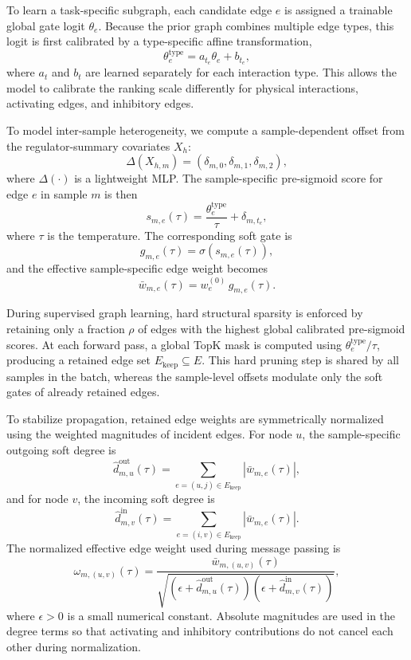 \documentclass[unnumsec,webpdf,modern,large]{oup-authoring-template}
\begin{document}
To learn a task-specific subgraph, each candidate edge \(e\) is assigned a trainable global gate logit \(\theta_e\). Because the prior graph combines multiple edge types, this logit is first calibrated by a type-specific affine transformation,
\[
\theta_e^{\mathrm{type}}=a_{t_e}\theta_e+b_{t_e},
\]
where \(a_t\) and \(b_t\) are learned separately for each interaction type. This allows the model to calibrate the ranking scale differently for physical interactions, activating edges, and inhibitory edges.

To model inter-sample heterogeneity, we compute a sample-dependent offset from the regulator-summary covariates \(X_h\):
\[
\Delta(X_{h,m})=(\delta_{m,0},\delta_{m,1},\delta_{m,2}),
\]
where \(\Delta(\cdot)\) is a lightweight MLP. The sample-specific pre-sigmoid score for edge \(e\) in sample \(m\) is then
\[
s_{m,e}(\tau)=\frac{\theta_e^{\mathrm{type}}}{\tau}+\delta_{m,t_e},
\]
where \(\tau\) is the temperature. The corresponding soft gate is
\[
g_{m,e}(\tau)=\sigma\!\left(s_{m,e}(\tau)\right),
\]
and the effective sample-specific edge weight becomes
\[
\bar w_{m,e}(\tau)=w_e^{(0)}\,g_{m,e}(\tau).
\]

During supervised graph learning, hard structural sparsity is enforced by retaining only a fraction \(\rho\) of edges with the highest global calibrated pre-sigmoid scores. At each forward pass, a global TopK mask is computed using \(\theta_e^{\mathrm{type}}/\tau\), producing a retained edge set \(E_{\mathrm{keep}}\subseteq E\). This hard pruning step is shared by all samples in the batch, whereas the sample-level offsets modulate only the soft gates of already retained edges.

To stabilize propagation, retained edge weights are symmetrically normalized using the weighted magnitudes of incident edges. For node \(u\), the sample-specific outgoing soft degree is
\[
\hat d^{\mathrm{out}}_{m,u}(\tau)=\sum_{e=(u,j)\in E_{\mathrm{keep}}}\left|\bar w_{m,e}(\tau)\right|,
\]
and for node \(v\), the incoming soft degree is
\[
\hat d^{\mathrm{in}}_{m,v}(\tau)=\sum_{e=(i,v)\in E_{\mathrm{keep}}}\left|\bar w_{m,e}(\tau)\right|.
\]
The normalized effective edge weight used during message passing is
\[
\omega_{m,(u,v)}(\tau)=
\frac{\bar w_{m,(u,v)}(\tau)}{\sqrt{\left(\epsilon+\hat d^{\mathrm{out}}_{m,u}(\tau)\right)\left(\epsilon+\hat d^{\mathrm{in}}_{m,v}(\tau)\right)}},
\]
where \(\epsilon>0\) is a small numerical constant. Absolute magnitudes are used in the degree terms so that activating and inhibitory contributions do not cancel each other during normalization.
\end{document}
